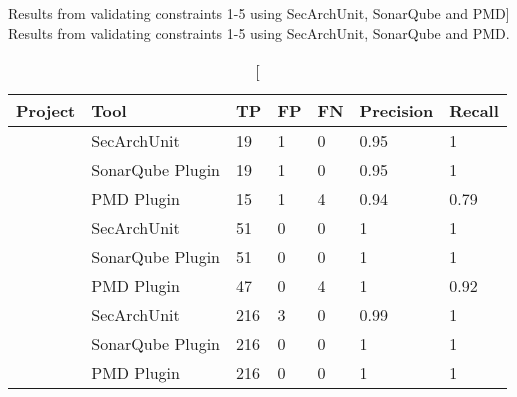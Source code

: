 \begin{table}[h]
\captionsetup{format=hang,justification=raggedright}
\caption
    [Results from validating constraints 1-5 using SecArchUnit, SonarQube and PMD]
    {Results from validating constraints 1-5 using SecArchUnit, SonarQube and PMD.}
\begin{center}
\begin{tabular}{lxggggg}
\textbf{Project} & \textbf{Tool} & \textbf{TP} & \textbf{FP} & \textbf{FN} & \textbf{Precision} & \textbf{Recall} \\
\hline
{}
        & SecArchUnit & 19 & 1 & 0 & 0.95 & 1 \\
        & SonarQube Plugin & 19 & 1 & 0 & 0.95 & 1 \\
        & PMD Plugin & 15 & 1 & 4 & 0.94 & 0.79 \\
\hline
{}
        & SecArchUnit & 51 & 0 & 0 & 1 & 1 \\
        & SonarQube Plugin & 51 & 0 & 0 & 1 & 1 \\
        & PMD Plugin & 47 & 0 & 4 & 1 & 0.92 \\
\hline
{}
        & SecArchUnit & 216 & 3 & 0 & 0.99 & 1 \\
        & SonarQube Plugin & 216 & 0 & 0 & 1 & 1 \\
        & PMD Plugin & 216 & 0 & 0 & 1 & 1 \\
\hline
\end{tabular}
\end{center}
\label{tab:results_comparison}
\end{table}